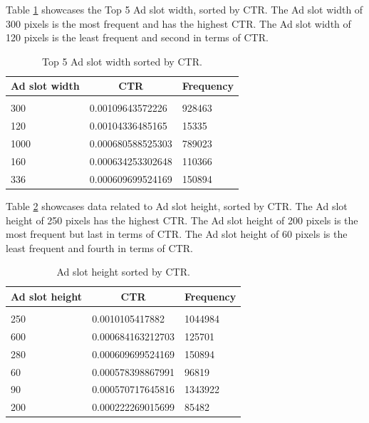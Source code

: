 \documentclass{article} %
\begin{document}
Table \ref{table:11} showcases the Top 5 Ad slot width, sorted by CTR. The Ad slot width of 300 pixels is the most frequent and has the highest CTR. The Ad slot width of 120 pixels is the least frequent and second in terms of CTR.

\begin{table}[!htbp]
\caption{Top 5 Ad slot width sorted by CTR.}
\label{table:11}
\begin{center}
\begin{tabular}{l l l}
\multicolumn{1}{c}{\bf Ad slot width} & \multicolumn{1}{c}{\bf CTR} & \multicolumn{1}{c}{\bf Frequency}
\\ \hline \\
300  & 0.00109643572226  & 928463\\
120  & 0.00104336485165  & 15335\\
1000 & 0.000680588525303 & 789023\\
160  & 0.000634253302648 & 110366\\
336  & 0.000609699524169 & 150894\\
\end{tabular}
\end{center}
\end{table}

Table \ref{table:12} showcases data related to Ad slot height, sorted by CTR. The Ad slot height of 250 pixels has the highest CTR. The Ad slot height of 200 pixels is the most frequent but last in terms of CTR. The Ad slot height of 60 pixels is the least frequent and fourth in terms of CTR.

\begin{table}[!htbp]
\caption{Ad slot height sorted by CTR.}
\label{table:12}
\begin{center}
\begin{tabular}{l l l}
\multicolumn{1}{c}{\bf Ad slot height} & \multicolumn{1}{c}{\bf CTR} & \multicolumn{1}{c}{\bf Frequency}
\\ \hline \\
250 & 0.0010105417882 & 1044984\\
600 & 0.000684163212703 & 125701\\
280 & 0.000609699524169 & 150894\\
60  & 0.000578398867991 & 96819\\
90  & 0.000570717645816 & 1343922\\
200 & 0.000222269015699 & 85482\\
\end{tabular}
\end{center}
\end{table}
\end{document}
